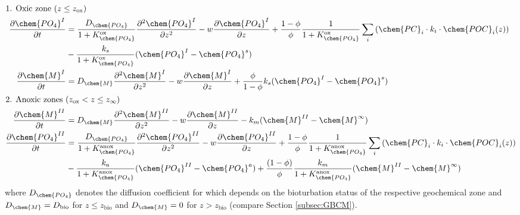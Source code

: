 \documentclass[gmd, manuscript]{copernicus}
\begin{document}
\begin{align}
\intertext{1. Oxic zone ($z \leq z_{\mathrm{ox}}$)}
 \frac{\partial \chem{PO_4}^I}{\partial t} &= \frac{D_{\chem{PO_4}}}{1+K_\chem{PO_4}^{\mathrm{ox}}} \frac{\partial^2\chem{PO_4}^I }{\partial z^2} - w\frac{\partial \chem{PO_4}^I }{\partial z} + \frac{1-\phi}{\phi}\frac{1}{1+K_\chem{PO_4}^{\mathrm{ox}}}\sum_i 
					\left( \chem{PC}_i \cdot k_i \cdot \chem{POC}_{i}(z) \right) \notag\\
					& - \frac{k_{s}}{1+K_\chem{PO_4}^{\mathrm{ox}}}(\chem{PO_4}^I-\chem{PO_4}^s)\label{eq:PO4_ODE_L1}\\  %
 \frac{\partial \chem{M}^I}{\partial t} &= D_{\chem{M}}\frac{\partial^2\chem{M}^I }{\partial z^2} - w\frac{\partial \chem{M}^I }{\partial z} + \frac{\phi}{1-\phi}k_{s}(\chem{PO_4}^I-\chem{PO_4}^s)\label{eq:M_ODE_L1}\\  
 \intertext{2. Anoxic zones ($z_{\mathrm{ox}} < z \leq z_{\infty}$)} 
 \frac{\partial \chem{M}^{II}}{\partial t} & = D_{\chem{M}}\frac{\partial^2\chem{M}^{II} }{\partial z^2} - w\frac{\partial \chem{M}^{II} }{\partial z} - k_{m}(\chem{M}^{II} - \chem{M}^\infty)\label{eq:M_ODE_L2}\\  
 \frac{\partial \chem{PO_4}^{II}}{\partial t} &= \frac{D_{\chem{PO_4}}}{1+K_\chem{PO_4}^{\mathrm{anox}}} \frac{\partial^2\chem{PO_4}^{II} }{\partial z^2} - w\frac{\partial \chem{PO_4}^{II} }{\partial z} + \frac{1-\phi}{\phi} \frac{1}{1+K_\chem{PO_4}^{\mathrm{anox}}}\sum_i 
					\left( \chem{PC}_i \cdot k_i \cdot \chem{POC}_{i}(z) \right) \notag\\
					& - \frac{k_{a}}{1+K_\chem{PO_4}^{\mathrm{anox}}}(\chem{PO_4}^{II}-\chem{PO_4}^a) + \frac{(1-\phi)}{\phi}\frac{k_{m}}{1+K_\chem{PO_4}^{\mathrm{anox}}}(\chem{M}^{II}-\chem{M}^\infty)\label{eq:PO4_ODE_L2}
\end{align}
where $D_\chem{PO_4}$ denotes the diffusion coefficient for  which depends on the bioturbation status of the respective geochemical zone and 
$D_{\chem{M}}=D_{\mathrm{bio}}$ for $z\leq z_{\mathrm{bio}}$ and $D_{\chem{M}}=0$ for $z > z_{\mathrm{bio}}$ (compare Section \ref{subsec:GBCM}). 
\end{document}
